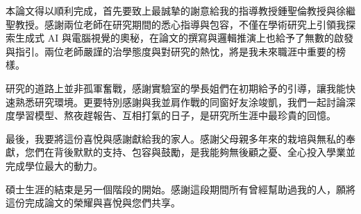 本論文得以順利完成，首先要致上最誠摯的謝意給我的指導教授鍾聖倫教授與徐繼聖教授。感謝兩位老師在研究期間的悉心指導與包容，不僅在學術研究上引領我探索生成式 AI 與電腦視覺的奧秘，在論文的撰寫與邏輯推演上也給予了無數的啟發與指引。兩位老師嚴謹的治學態度與對研究的熱忱，將是我未來職涯中重要的榜樣。

研究的道路上並非孤軍奮戰，感謝實驗室的學長姐們在初期給予的引導，讓我能快速熟悉研究環境。更要特別感謝與我並肩作戰的同窗好友涂竣凱，我們一起討論深度學習模型、熬夜趕報告、互相打氣的日子，是研究所生涯中最珍貴的回憶。

最後，我要將這份喜悅與感謝獻給我的家人。感謝父母親多年來的栽培與無私的奉獻，您們在背後默默的支持、包容與鼓勵，是我能夠無後顧之憂、全心投入學業並完成學位最大的動力。

碩士生涯的結束是另一個階段的開始。感謝這段期間所有曾經幫助過我的人，願將這份完成論文的榮耀與喜悅與您們共享。
